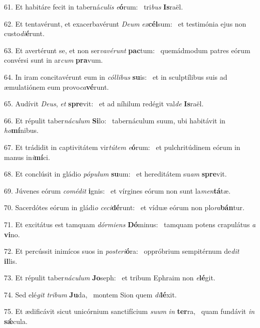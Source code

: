61. Et habitáre fecit in taberná\textit{cu}\textit{lis} \textit{e}\textbf{ó}rum: \ast\  tri\textit{bus} \textbf{Is}raël.\

62. Et tentavérunt, et exacerbavérunt \textit{De}\textit{um} \textit{ex}\textbf{cél}sum: \ast\  et testimónia ejus non custo\textit{di}\textbf{é}runt.\

63. Et avertérunt se, et non ser\textit{va}\textit{vé}\textit{runt} \textbf{pac}tum: \ast\  quemádmodum patres eórum convérsi sunt in ar\textit{cum} \textbf{pra}vum.\

64. In iram concitavérunt eum in \textit{cól}\textit{li}\textit{bus} \textbf{su}is: \ast\  et in sculptílibus suis ad æmulatiónem eum provo\textit{ca}\textbf{vé}runt.\

65. Audívit \textit{De}\textit{us}, \textit{et} \textbf{spre}vit: \ast\  et ad níhilum redégit val\textit{de} \textbf{Is}raël.\

66. Et répulit taber\textit{ná}\textit{cu}\textit{lum} \textbf{Si}lo: \ast\  tabernáculum suum, ubi habitávit in \textit{ho}\textbf{mí}nibus.\

67. Et trádidit in captivitátem vir\textit{tú}\textit{tem} \textit{e}\textbf{ó}rum: \ast\  et pulchritúdinem eórum in manus in\textit{i}\textbf{mí}ci.\

68. Et conclúsit in gládio \textit{pó}\textit{pu}\textit{lum} \textbf{su}um: \ast\  et hereditátem su\textit{am} \textbf{spre}vit.\

69. Júvenes eórum \textit{com}\textit{é}\textit{dit} \textbf{i}gnis: \ast\  et vírgines eórum non sunt la\textit{men}\textbf{tá}tæ.\

70. Sacerdótes eórum in gládi\textit{o} \textit{ce}\textit{ci}\textbf{dé}runt: \ast\  et víduæ eórum non plo\textit{ra}\textbf{bán}tur.\

71. Et excitátus est tamquam \textit{dór}\textit{mi}\textit{ens} \textbf{Dó}minus: \ast\  tamquam potens crapulátus \textit{a} \textbf{vi}no.\

72. Et percússit inimícos suos in \textit{post}\textit{e}\textit{ri}\textbf{ó}ra: \ast\  oppróbrium sempitérnum de\textit{dit} \textbf{il}lis.\

73. Et répulit taber\textit{ná}\textit{cu}\textit{lum} \textbf{Jo}seph: \ast\  et tribum Ephraim non \textit{e}\textbf{lé}git.\

74. Sed elé\textit{git} \textit{tri}\textit{bum} \textbf{Ju}da, \ast\  montem Sion quem \textit{di}\textbf{lé}xit.\

75. Et ædificávit sicut unicórnium sanctifícium \textit{su}\textit{um} \textit{in} \textbf{ter}ra, \ast\  quam fundávit \textit{in} \textbf{sǽ}cula.\

